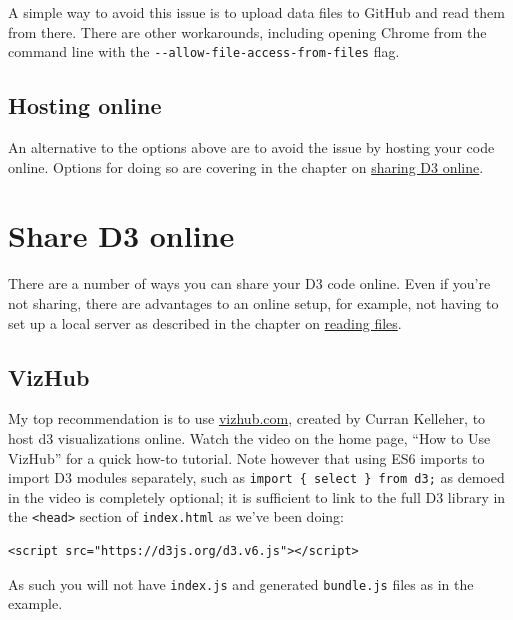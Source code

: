 \documentclass[
  openany]{book}
\begin{document}
A simple way to avoid this issue is to upload data files to GitHub and read them from there. There are other workarounds, including opening Chrome from the command line with the \texttt{-\/-allow-file-access-from-files} flag.

\hypertarget{hosting-online}{%
\section{Hosting online}\label{hosting-online}}

An alternative to the options above are to avoid the issue by hosting your code online. Options for doing so are covering in the chapter on \href{share-d3-online.html}{sharing D3 online}.

\hypertarget{share-d3-online}{%
\chapter{\texorpdfstring{Share D3 online }{Share D3 online }}\label{share-d3-online}}

There are a number of ways you can share your D3 code online. Even if you're not sharing, there are advantages to an online setup, for example, not having to set up a local server as described in the chapter on \href{reading-files.html}{reading files}.

\hypertarget{vizhub}{%
\section{VizHub}\label{vizhub}}

My top recommendation is to use \href{http://www.vizhub.com}{vizhub.com}, created by Curran Kelleher, to host d3 visualizations online. Watch the video on the home page, ``How to Use VizHub'' for a quick how-to tutorial. Note however that using ES6 imports to import D3 modules separately, such as \texttt{import\ \{\ select\ \}\ from\ \textquotesingle{}d3\textquotesingle{};} as demoed in the video is completely optional; it is sufficient to link to the full D3 library in the \texttt{\textless{}head\textgreater{}} section of \texttt{index.html} as we've been doing:

\begin{verbatim}
<script src="https://d3js.org/d3.v6.js"></script>
\end{verbatim}

As such you will not have \texttt{index.js} and generated \texttt{bundle.js} files as in the example.
\end{document}
